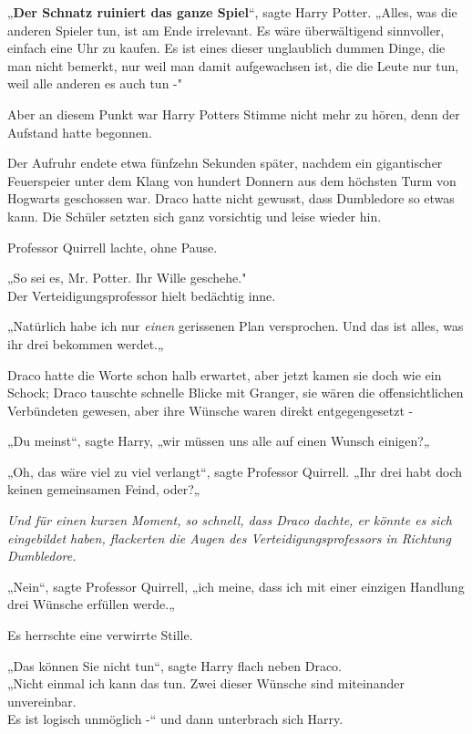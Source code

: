 {„\textbf{Der Schnatz ruiniert das ganze Spiel}“, sagte Harry Potter. „Alles, was die anderen Spieler tun, ist am Ende irrelevant. Es wäre überwältigend sinnvoller, einfach eine Uhr zu kaufen. Es ist eines dieser unglaublich dummen Dinge, die man nicht bemerkt, nur weil man damit aufgewachsen ist, die die Leute nur tun, weil alle anderen es auch tun -"

Aber an diesem Punkt war Harry Potters Stimme nicht mehr zu hören, denn der Aufstand hatte begonnen.

Der Aufruhr endete etwa fünfzehn Sekunden später, nachdem ein gigantischer Feuerspeier unter dem Klang von hundert Donnern aus dem höchsten Turm von Hogwarts geschossen war. Draco hatte nicht gewusst, dass Dumbledore so etwas kann. Die Schüler setzten sich ganz vorsichtig und leise wieder hin.

Professor Quirrell lachte, ohne Pause.

„So sei es, Mr. Potter. Ihr Wille geschehe."\\ Der Verteidigungsprofessor hielt bedächtig inne.

„Natürlich habe ich nur \emph{einen} gerissenen Plan versprochen. Und das ist alles, was ihr drei bekommen werdet.„

Draco hatte die Worte schon halb erwartet, aber jetzt kamen sie doch wie ein Schock; Draco tauschte schnelle Blicke mit Granger, sie wären die offensichtlichen Verbündeten gewesen, aber ihre Wünsche waren direkt entgegengesetzt -

„Du meinst“, sagte Harry, „wir müssen uns alle auf einen Wunsch einigen?„

„Oh, das wäre viel zu viel verlangt“, sagte Professor Quirrell. „Ihr drei habt doch keinen gemeinsamen Feind, oder?„

\emph{Und für einen kurzen Moment, so schnell, dass Draco dachte, er könnte es sich eingebildet haben, flackerten die Augen des Verteidigungsprofessors in Richtung Dumbledore.}

„Nein“, sagte Professor Quirrell, „ich meine, dass ich mit einer einzigen Handlung drei Wünsche erfüllen werde.„

Es herrschte eine verwirrte Stille.

„Das können Sie nicht tun“, sagte Harry flach neben Draco.\\ „Nicht einmal ich kann das tun. Zwei dieser Wünsche sind miteinander unvereinbar.\\ Es ist logisch unmöglich -“ und dann unterbrach sich Harry.

}
